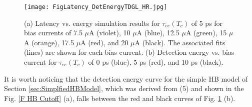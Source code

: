 \documentclass[%
reprint,
 amsmath,amssymb,
aps,
pra,
]{revtex4-1}
\begin{document}
\begin{figure}
\texttt{[image: FigLatency\_DetEnergyTDGL\_HR.jpg]}
\caption{(a) Latency vs. energy simulation results for \(\tau_{ee} \left(T_c\right)\) of 5 ps for bias currents of 7.5 \(\mu\)A (violet), 10 \(\mu\)A (blue), 12.5 \(\mu\)A (green), 15 \(\mu\)A (orange), 17.5 \(\mu\)A (red), and 20 \(\mu\)A (black).  The associated fits (lines) are shown for each bias current.  (b) Detection energy vs. bias current for \(\tau_{ee}\left(T_c\right) \) of 0 ps (blue), 5 ps (red), and 10 ps (black).
}
\label{F Latency and Cutoff}
\end{figure}
\quad It is worth noticing that the detection energy curve for the simple HB model of Section \ref{sec:SimplfiedHBModel}, which was derived from (5) and shown in the Fig. \ref{F HB Cutoff} (a), falls between the red and black curves of Fig. \ref{F Latency and Cutoff} (b).
\end{document}
